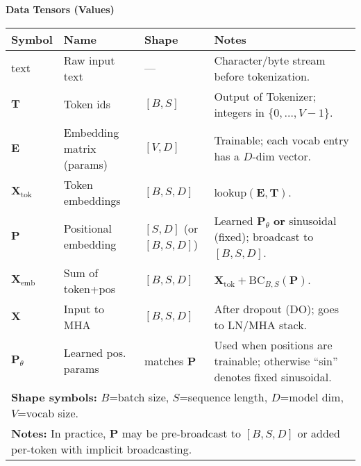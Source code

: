 \documentclass{article}
\begin{document}
\begin{center}
\textbf{Data Tensors (Values)}
\begin{tabular}{llll}
\hline
\textbf{Symbol} & \textbf{Name} & \textbf{Shape} & \textbf{Notes} \\
\hline
text & Raw input text & — & Character/byte stream before tokenization. \\
$\mathbf{T}$ & Token ids & $[B,S]$ & Output of Tokenizer; integers in $\{0,\dots,V{-}1\}$. \\
$\mathbf{E}$ & Embedding matrix (params) & $[V,D]$ & Trainable; each vocab entry has a $D$-dim vector. \\
$\mathbf{X}_{\text{tok}}$ & Token embeddings & $[B,S,D]$ & $\mathrm{lookup}(\mathbf{E}, \mathbf{T})$. \\
$\mathbf{P}$ & Positional embedding & $[S,D]$ (or $[B,S,D]$) & Learned $\mathbf{P}_\theta$ \textbf{or} sinusoidal (fixed); broadcast to $[B,S,D]$. \\
$\mathbf{X}_{\text{emb}}$ & Sum of token+pos & $[B,S,D]$ & $\mathbf{X}_{\text{tok}} + \mathrm{BC}_{B,S}(\mathbf{P})$. \\
$\mathbf{X}$ & Input to MHA & $[B,S,D]$ & After dropout (DO); goes to LN/MHA stack. \\
$\mathbf{P}_\theta$ & Learned pos. params & matches $\mathbf{P}$ & Used when positions are trainable; otherwise “sin” denotes fixed sinusoidal. \\
\hline
\multicolumn{4}{l}{\textbf{Shape symbols:}\; $B$=batch size,\; $S$=sequence length,\; $D$=model dim,\; $V$=vocab size.} \\
\multicolumn{4}{l}{\textbf{Notes:}\; In practice, $\mathbf{P}$ may be pre-broadcast to $[B,S,D]$ or added per-token with implicit broadcasting.} \\
\hline
\end{tabular}
\end{center}
\end{document}
